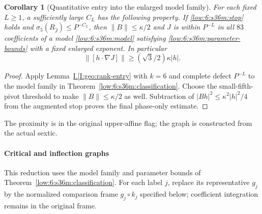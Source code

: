 \documentclass[11pt]{amsart}
\newtheorem{corollary}[theorem]{Corollary}
\theoremstyle{definition}
\theoremstyle{remark}
\numberwithin{equation}{section}
\newcommand{\partIref}[1]{\hyperref[I:#1]{I.\ref*{I:#1}}}
\begin{document}
\begin{corollary}[Quantitative entry into the enlarged model family]\label{low:6:s36m:entry}
For each fixed $L\ge1$, a sufficiently large $C_L$ has the following property. If \eqref{low:6:s36m:stop} holds and $\sigma_5(R_{\widehat J})\le P^{-C_L}$, then $\|B\|\le\kappa/2$ and $J$ is within $P^{-L}$ in all $83$ coefficients of a model \eqref{low:6:s36m:model} satisfying \eqref{low:6:s36m:parameter-bounds} with a fixed enlarged exponent. In particular
\[
\|[h\cdot\nabla J]\|\ge (\sqrt3/2)\kappa|h|.
\]
\end{corollary}
\begin{proof}
Apply Lemma~\partIref{geo:rank-entry} with $k=6$ and complete defect $P^{-L}$ to the model family in Theorem~\ref{low:6:s36m:classification}. Choose the small-fifth-pivot threshold to make $\|B\|\le\kappa/2$ as well. Subtraction of $|Bh|^2\le\kappa^2|h|^2/4$ from the augmented stop proves the final phase-only estimate.
\end{proof}

The proximity is in the original upper-affine flag; the graph is constructed from the actual sextic.


\paragraph{Critical and inflection graphs}

This reduction uses the model family and parameter bounds of Theorem~\ref{low:6:s36m:classification}. For each label $j$, replace its representative $g_j$ by the normalized comparison frame $g_j\circ k_j$ specified below; coefficient integration remains in the original frame.
\end{document}
